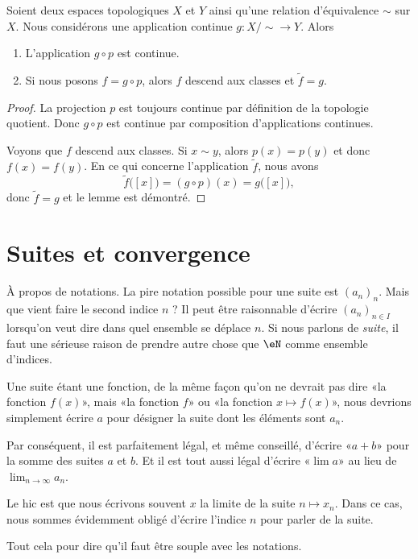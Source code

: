 \begin{lemma}
	Soient deux espaces topologiques \( X\) et \( Y\) ainsi qu'une relation d'équivalence \( \sim\) sur \( X\). Nous considérons une application continue \( g\colon X/\sim\to Y\). Alors
	\begin{enumerate}
		\item
		      L'application \( g\circ p\) est continue.
		\item
		      Si nous posons \( f=g\circ p\), alors \( f\) descend aux classes et \( \tilde f=g\).
	\end{enumerate}
\end{lemma}

\begin{proof}
	La projection \( p\) est toujours continue par définition de la topologie quotient. Donc \( g\circ p\) est continue par composition d'applications continues.

	Voyons que \( f\) descend aux classes. Si \( x\sim y\), alors \( p(x)=p(y)\) et donc \( f(x)=f(y)\). En ce qui concerne l'application \( \tilde f\), nous avons
	\begin{equation}
		\tilde f\big( [x] \big)=(g\circ p)(x)=g\big( [x] \big),
	\end{equation}
	donc \( \tilde f=g\) et le lemme est démontré.
\end{proof}

\section{Suites et convergence}

\begin{normaltext}
	À propos de notations. La pire notation possible pour une suite est \( (a_n)_n\). Mais que vient faire le second indice \( n\) ? Il peut être raisonnable d'écrire \( (a_n)_{n\in I}\) lorsqu'on veut dire dans quel ensemble se déplace \( n\). Si nous parlons de \emph{suite}, il faut une sérieuse raison de prendre autre chose que \( \eN\) comme ensemble d'indices.

	Une suite étant une fonction, de la même façon qu'on ne devrait pas dire «la fonction \( f(x)\)», mais «la fonction \( f\)» ou «la fonction \( x\mapsto f(x)\)», nous devrions simplement écrire \( a\) pour désigner la suite dont les éléments sont \( a_n\).

	Par conséquent, il est parfaitement légal, et même conseillé, d'écrire «\( a+b\)» pour la somme des suites \( a\) et \( b\). Et il est tout aussi légal d'écrire «\( \lim a\)» au lieu de \( \lim_{n\to \infty} a_n\).

	Le hic est que nous écrivons souvent \( x\) la limite de la suite \( n\mapsto x_n\). Dans ce cas, nous sommes évidemment obligé d'écrire l'indice \( n\) pour parler de la suite.

	Tout cela pour dire qu'il faut être souple avec les notations.
\end{normaltext}

